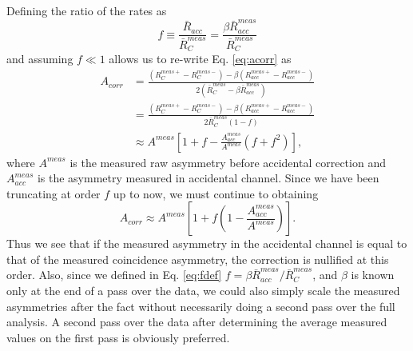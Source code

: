 \documentclass[12pt]{article}
\begin{document}
Defining the ratio of the rates as 
\begin{equation}\label{eq:fdef}
f\equiv\frac{\bar{R}_{acc}}{\bar{R}_C^{meas}}=\frac{\beta\bar{R}_{acc}^{meas}}{\bar{R}_C^{meas}}
\end{equation} and assuming $f\ll1$ allows us to re-write Eq. \ref{eq:acorr} as
\begin{align}
A_{corr}&=\frac{(R_C^{meas +}-R_C^{meas -})-\beta(R_{acc}^{meas +}-R_{acc}^{meas -})}{2(\bar{R}_C^{meas}-\beta\bar{R}_{acc}^{meas})}\\
&=\frac{(R_C^{meas +}-R_C^{meas -})-\beta(R_{acc}^{meas +}-R_{acc}^{meas -})}{2\bar{R}_C^{meas}(1-f)}\\
&\approx A^{meas}\left[1+f-\frac{A_{acc}^{meas}}{A^{meas}}(f+f^2)\right],
\end{align}
where $A^{meas}$ is the measured raw asymmetry before accidental correction and $A_{acc}^{meas}$ is the asymmetry measured in accidental channel. Since we have been truncating at order $f$ up to now, we must continue to obtaining
\begin{equation}
A_{corr}\approx A^{meas}\left[1+f(1-\frac{A_{acc}^{meas}}{A^{meas}})\right].
\end{equation}
Thus we see that if the measured asymmetry in the accidental channel is equal to that of the measured coincidence asymmetry, the correction is nullified at this order. Also, since we defined in Eq. \ref{eq:fdef} $f=\beta\bar{R}_{acc}^{meas}/\bar{R}_C^{meas}$, and $\beta$ is known only at the end of a pass over the data, we could also simply scale the measured asymmetries after the fact without necessarily doing a second pass over the full analysis. A second pass over the data after determining the average measured values on the first pass is obviously preferred.
%
%
%
\end{document}
